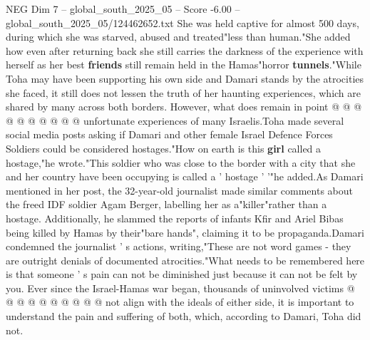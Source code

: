 \begin{textsample}{NEG Dim 7 – global\_south\_2025\_05 – Score -6.00 – global\_south\_2025\_05/124462652.txt}
She was held captive for almost 500 days, during which she was starved, abused and treated"less than human."She added how even after returning back she still carries the darkness of the experience with herself as her best \textbf{friends} still remain held in the Hamas"horror \textbf{tunnels}."While Toha may have been supporting his own side and Damari stands by the atrocities she faced, it still does not lessen the truth of her haunting experiences, which are shared by many across both borders.
However, what does remain in point @ @ @ @ @ @ @ @ @ @ unfortunate experiences of many Israelis.Toha made several social media posts asking if Damari and other female Israel Defence Forces Soldiers could be considered hostages."How on earth is this \textbf{girl} called a hostage,"he wrote."This soldier who was close to the border with a city that she and her country have been occupying is called a ' hostage ' '"he added.As Damari mentioned in her post, the 32-year-old journalist made similar comments about the freed IDF soldier Agam Berger, labelling her as a"killer"rather than a hostage.
Additionally, he slammed the reports of infants Kfir and Ariel Bibas being killed by Hamas by their"bare hands", claiming it to be propaganda.Damari condemned the journalist ' s actions, writing,"These are not word games - they are outright denials of documented atrocities."What needs to be remembered here is that someone ' s pain can not be diminished just because it can not be felt by you.
Ever since the Israel-Hamas war began, thousands of uninvolved victims @ @ @ @ @ @ @ @ @ @ not align with the ideals of either side, it is important to understand the pain and suffering of both, which, according to Damari, Toha did not.

\end{textsample}
